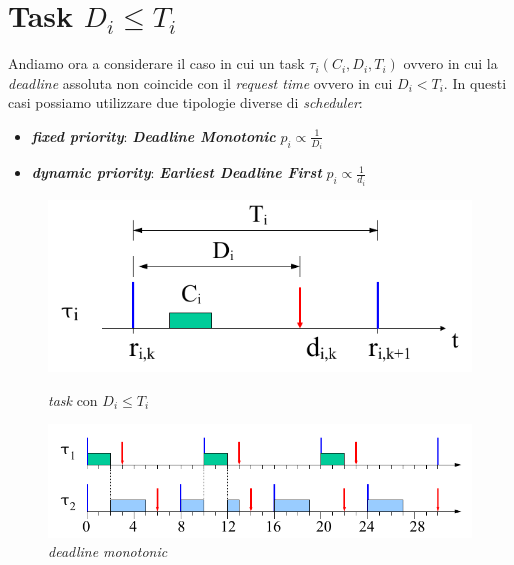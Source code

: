 \newpage
\section{Task $D_i \leq T_i$}
Andiamo ora a considerare il caso in cui un task $\tau_i(C_i, D_i, T_i)$ ovvero in cui la \textit{deadline} assoluta non coincide con il \textit{request time} ovvero in cui $D_i < T_i$. In questi casi possiamo utilizzare due tipologie diverse di \textit{scheduler}:
\begin{itemize}
    \item \textbf{\textit{fixed priority}}: \textbf{\textit{Deadline Monotonic}} $p_i \propto \frac{1}{D_i}$
    \item \textbf{\textit{dynamic priority}}: \textbf{\textit{Earliest Deadline First}} $p_i \propto \frac{1}{d_i}$
\end{itemize}
\begin{figure}[h]
    \centering
    \begin{minipage}[t]{0.45\textwidth}
        \centering
        \includegraphics[width=\textwidth]{img/d_less_t_task}
        \caption{\textit{task} con $D_i \leq T_i$}
    \end{minipage}
    \begin{minipage}[t]{0.45\textwidth}
        \centering
        \includegraphics[width=\textwidth]{img/dm_1}
        \caption{\textit{deadline monotonic}}
    \end{minipage}
\end{figure}

